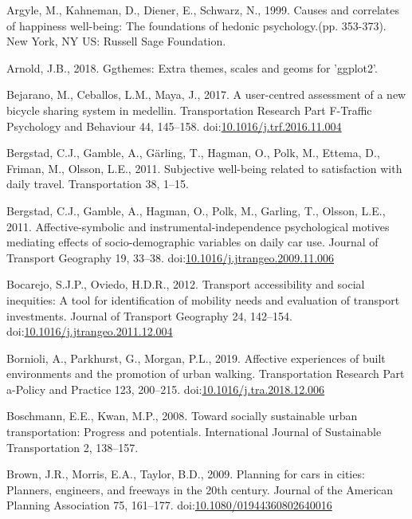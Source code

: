 \documentclass[]{elsarticle} %
\begin{document}
\leavevmode\hypertarget{ref-Argyle1999causes}{}%
Argyle, M., Kahneman, D., Diener, E., Schwarz, N., 1999. Causes and
correlates of happiness well-being: The foundations of hedonic
psychology.(pp. 353-373). New York, NY US: Russell Sage Foundation.

\leavevmode\hypertarget{ref-Arnold2018}{}%
Arnold, J.B., 2018. Ggthemes: Extra themes, scales and geoms for
'ggplot2'.

\leavevmode\hypertarget{ref-Bejarano2017user}{}%
Bejarano, M., Ceballos, L.M., Maya, J., 2017. A user-centred assessment
of a new bicycle sharing system in medellin. Transportation Research
Part F-Traffic Psychology and Behaviour 44, 145--158.
doi:\href{https://doi.org/10.1016/j.trf.2016.11.004}{10.1016/j.trf.2016.11.004}

\leavevmode\hypertarget{ref-Bergstad2011subjective}{}%
Bergstad, C.J., Gamble, A., Gärling, T., Hagman, O., Polk, M., Ettema,
D., Friman, M., Olsson, L.E., 2011. Subjective well-being related to
satisfaction with daily travel. Transportation 38, 1--15.

\leavevmode\hypertarget{ref-Bergstad2011affective}{}%
Bergstad, C.J., Gamble, A., Hagman, O., Polk, M., Garling, T., Olsson,
L.E., 2011. Affective-symbolic and instrumental-independence
psychological motives mediating effects of socio-demographic variables
on daily car use. Journal of Transport Geography 19, 33--38.
doi:\href{https://doi.org/10.1016/j.jtrangeo.2009.11.006}{10.1016/j.jtrangeo.2009.11.006}

\leavevmode\hypertarget{ref-Bocarejo2012transport}{}%
Bocarejo, S.J.P., Oviedo, H.D.R., 2012. Transport accessibility and
social inequities: A tool for identification of mobility needs and
evaluation of transport investments. Journal of Transport Geography 24,
142--154.
doi:\href{https://doi.org/10.1016/j.jtrangeo.2011.12.004}{10.1016/j.jtrangeo.2011.12.004}

\leavevmode\hypertarget{ref-Bornioli2019affective}{}%
Bornioli, A., Parkhurst, G., Morgan, P.L., 2019. Affective experiences
of built environments and the promotion of urban walking. Transportation
Research Part a-Policy and Practice 123, 200--215.
doi:\href{https://doi.org/10.1016/j.tra.2018.12.006}{10.1016/j.tra.2018.12.006}

\leavevmode\hypertarget{ref-Boschman2008toward}{}%
Boschmann, E.E., Kwan, M.P., 2008. Toward socially sustainable urban
transportation: Progress and potentials. International Journal of
Sustainable Transportation 2, 138--157.

\leavevmode\hypertarget{ref-Brown2009planning}{}%
Brown, J.R., Morris, E.A., Taylor, B.D., 2009. Planning for cars in
cities: Planners, engineers, and freeways in the 20th century. Journal
of the American Planning Association 75, 161--177.
doi:\href{https://doi.org/10.1080/01944360802640016}{10.1080/01944360802640016}
\end{document}

